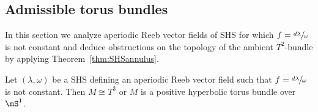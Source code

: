 \subsection{Admissible torus bundles}

In this section we analyze aperiodic Reeb vector fields of SHS for which $f=\sfrac{d\lambda}{\omega}$ is not constant and deduce obstructions on the topology of the ambient $T^2$-bundle by applying Theorem~\ref{thm:SHSannulus}.

\begin{prop}\label{prop:bundles}
Let $(\lambda, \omega)$ be a SHS defining an aperiodic Reeb vector field such that $f=\sfrac{d\lambda}{\omega}$ is not constant. Then $M\cong T^3$ or $M$ is a positive hyperbolic torus bundle over $\mS^1$.
\end{prop}

